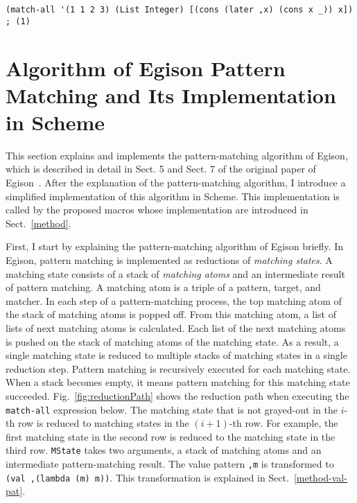 \documentclass[acmlarge]{acmart}
\newcommand{\new}[1]{\textcolor{blue}{#1}}
\begin{document}
\begin{lstlisting}[language=egison]
(match-all '(1 1 2 3) (List Integer) [(cons (later ,x) (cons x _)) x]) ; (1)
\end{lstlisting}



\section{Algorithm of Egison Pattern Matching and Its Implementation in Scheme}\label{algorithm}

This section explains and implements the pattern-matching algorithm of Egison, which is described in detail in Sect. 5 and Sect. 7 of the original paper of Egison~\cite{egi2018aplas}.
After the explanation of the pattern-matching algorithm, I introduce a simplified implementation of this algorithm in Scheme.
This implementation is called by the proposed macros whose implementation are introduced in Sect.~\ref{method}.

\medskip

First, I start by explaining the pattern-matching algorithm of Egison briefly.
In Egison, pattern matching is implemented as reductions of \emph{matching states}.
A matching state consists of a stack of \emph{matching atoms} and an intermediate result of pattern matching.
A matching atom is a triple of a pattern, target, and matcher.
In each step of a pattern-matching process, the top matching atom of the stack of matching atoms is popped off.
From this matching atom, a list of lists of next matching atoms is calculated.
Each list of the next matching atoms is pushed on the stack of matching atoms of the matching state.
As a result, a single matching state is reduced to multiple stacks of matching states in a single reduction step.
Pattern matching is recursively executed for each matching state.
When a stack becomes empty, it means pattern matching for this matching state succeeded.
Fig.~\ref{fig:reductionPath} shows the reduction path when executing the \lstinline{match-all} expression below.
The matching state that is not grayed-out in the $i$-th row is reduced to matching states in the $(i+1)$-th row.
For example, the first matching state in the second row is reduced to the matching state in the third row.
\texttt{MState} takes two arguments, a stack of matching atoms and an intermediate pattern-matching result.
The value pattern \lstinline{,m} is transformed to \lstinline{(val ,(lambda (m) m))}.
This transformation is explained in Sect.~\ref{method-val-pat}.
\end{document}
